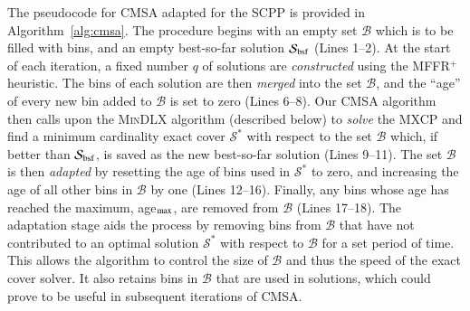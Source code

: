 \documentclass[a4paper,11pt,authoryear]{elsarticle}
\begin{document}

The pseudocode for CMSA adapted for the SCPP is provided in Algorithm~\ref{alg:cmsa}. The procedure begins with an empty set $\mathcal{B}$ which is to be filled with bins, and an empty best-so-far solution $\mathcal{S}_{\textup{bsf}}$ (Lines 1--2). At the start of each iteration, a fixed number $q$ of solutions are \emph{constructed} using the MFFR$^+$ heuristic. The bins of each solution are then \emph{merged} into the set $\mathcal{B}$, and the ``age'' of every new bin added to $\mathcal{B}$ is set to zero (Lines 6--8). Our CMSA algorithm then calls upon the \textsc{MinDLX} algorithm (described below) to \emph{solve} the MXCP and find a minimum cardinality exact cover $\mathcal{S}^*$ with respect to the set $\mathcal{B}$ which, if better than $\mathcal{S}_{\textup{bsf}}$, is saved as the new best-so-far solution (Lines 9--11). The set $\mathcal{B}$ is then \emph{adapted} by resetting the age of bins used in $\mathcal{S}^*$ to zero, and increasing the age of all other bins in $\mathcal{B}$ by one (Lines 12--16). Finally, any bins whose age has reached the maximum, age$_{\textup{max}}$, are removed from $\mathcal{B}$ (Lines 17--18). The adaptation stage aids the process by removing bins from $\mathcal{B}$ that have not contributed to an optimal solution $\mathcal{S}^*$ with respect to $\mathcal{B}$ for a set period of time. This allows the algorithm to control the size of $\mathcal{B}$ and thus the speed of the exact cover solver. It also retains bins in $\mathcal{B}$ that are used in solutions, which could prove to be useful in subsequent iterations of CMSA.

\end{document}
